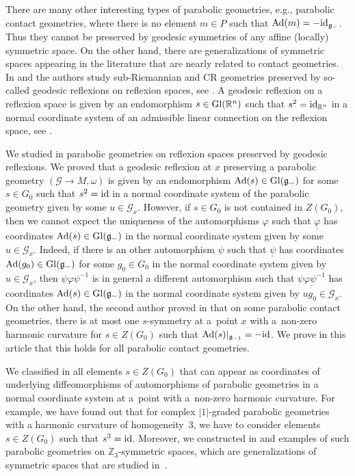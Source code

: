 \documentclass[pdftex]{sigma}
\newcommand{\om}{\omega}
\newcommand{\un}{\underline}
\newcommand{\ba}{\mathcal{G}}
\newcommand{\fg}{\mathfrak g}
\newcommand{\Ad}{{\rm Ad}}
\newcommand{\id}{{\rm id}}
\numberwithin{equation}{section}
\begin{document}
There are many other interesting types of parabolic geometries, e.g., parabolic contact geometries, where there is no element $m\in P$ such that $\Ad(m)=-\id_{\fg_-}$. Thus they cannot be preserved by geodesic symmetries of any af\/f\/ine (locally) symmetric space. On the other hand, there are generalizations of symmetric spaces appearing in the literature that are nearly related to contact geometries.
In \cite{BFG} and \cite{KZ} the authors study sub-Riemannian and CR geometries preserved by so-called geodesic ref\/lexions on ref\/lexion spaces, see \cite{Loos}. A geodesic ref\/lexion on a ref\/lexion space is given by an endomorphism $s\in {\rm Gl}(\mathbb{R}^n)$ such that $s^2=\id_{\mathbb{R}^n}$ in a normal coordinate system of an admissible linear connection on the ref\/lexion space, see \cite{Loos}.

We studied in \cite{disertace,GZ} parabolic geometries on ref\/lexion spaces preserved by geodesic ref\/lexions. We proved that a geodesic ref\/lexion at $x$ preserving a parabolic geometry $(\ba\to M,\om)$ is given by an endomorphism $\Ad(s)\in {\rm Gl}(\fg_-)$ for some $s\in G_0$ such that $s^2=\id$ in a normal coordinate system of the parabolic geometry given by some $u\in \ba_x$. However, if $s\in G_0$ is not contained in $Z(G_0)$, then we cannot expect the uniqueness of the automorphisms $\varphi$ such that $\un{\varphi}$ has coordinates $\Ad(s)\in {\rm Gl}(\fg_-)$ in the normal coordinate system given by some $u\in \ba_x$. Indeed, if there is an other automorphism $\psi$ such that $\un{\psi}$ has coordinates $\Ad(g_0)\in {\rm Gl}(\fg_-)$ for some $g_0\in G_0$ in the normal coordinate system given by $u\in \ba_x$, then $\psi\varphi\psi^{-1}$ is in general a dif\/ferent automorphism such that $\un{\psi\varphi\psi^{-1}}$ has coordinates $\Ad(s)\in {\rm Gl}(\fg_-)$ in the normal coordinate system given by $ug_0\in \ba_x$. On the other hand, the second author proved in \cite[Section~5]{LZ2} that on some parabolic contact geometries, there is at most one $s$-symmetry at a~point $x$ with a~non-zero harmonic curvature for $s\in Z(G_0)$ such that $\Ad(s)|_{\fg_{-1}}=-\id$. We prove in this article that this holds for all parabolic contact geometries.

We classif\/ied in \cite{GZ3} all elements $s\in Z(G_0)$ that can appear as coordinates of underlying dif\/feomorphisms of automorphisms of parabolic geometries in a normal coordinate system at a~point with a~non-zero harmonic curvature. For example, we have found out that for complex $|1|$-graded parabolic geometries with a harmonic curvature of homogeneity~$3$, we have to consider elements $s\in Z(G_0)$ such that $s^3=\id$. Moreover, we constructed in \cite[Proposition~6.1]{GZ2} and \cite[Proposition~7.2]{GZ3} examples of such parabolic geometries on $\mathbb{Z}_3$-symmetric spaces, which are generalizations of symmetric spaces that are studied in~\cite{Kowalski}.
\end{document}
